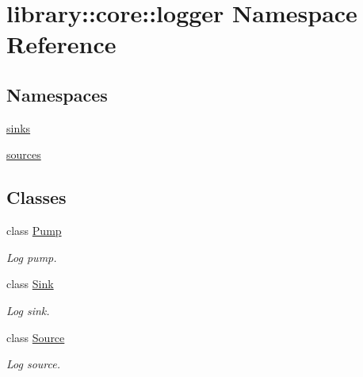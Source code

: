 \hypertarget{namespacelibrary_1_1core_1_1logger}{}\section{library\+::core\+::logger Namespace Reference}
\label{namespacelibrary_1_1core_1_1logger}
\subsection*{Namespaces}
\begin{DoxyCompactItemize}
\item 
 \mbox{\hyperlink{namespacelibrary_1_1core_1_1logger_1_1sinks}{sinks}}
\item 
 \mbox{\hyperlink{namespacelibrary_1_1core_1_1logger_1_1sources}{sources}}
\end{DoxyCompactItemize}
\subsection*{Classes}
\begin{DoxyCompactItemize}
\item 
class \mbox{\hyperlink{classlibrary_1_1core_1_1logger_1_1_pump}{Pump}}
\begin{DoxyCompactList}\small\item\em Log pump. \end{DoxyCompactList}\item 
class \mbox{\hyperlink{classlibrary_1_1core_1_1logger_1_1_sink}{Sink}}
\begin{DoxyCompactList}\small\item\em Log sink. \end{DoxyCompactList}\item 
class \mbox{\hyperlink{classlibrary_1_1core_1_1logger_1_1_source}{Source}}
\begin{DoxyCompactList}\small\item\em Log source. \end{DoxyCompactList}\end{DoxyCompactItemize}
